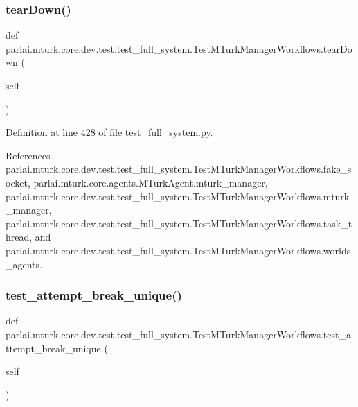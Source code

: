 \subsubsection{\texorpdfstring{tear\+Down()}{tearDown()}}
{\footnotesize\ttfamily def parlai.\+mturk.\+core.\+dev.\+test.\+test\+\_\+full\+\_\+system.\+Test\+M\+Turk\+Manager\+Workflows.\+tear\+Down (\begin{DoxyParamCaption}\item[{}]{self }\end{DoxyParamCaption})}



Definition at line 428 of file test\+\_\+full\+\_\+system.\+py.



References parlai.\+mturk.\+core.\+dev.\+test.\+test\+\_\+full\+\_\+system.\+Test\+M\+Turk\+Manager\+Workflows.\+fake\+\_\+socket, parlai.\+mturk.\+core.\+agents.\+M\+Turk\+Agent.\+mturk\+\_\+manager, parlai.\+mturk.\+core.\+dev.\+test.\+test\+\_\+full\+\_\+system.\+Test\+M\+Turk\+Manager\+Workflows.\+mturk\+\_\+manager, parlai.\+mturk.\+core.\+dev.\+test.\+test\+\_\+full\+\_\+system.\+Test\+M\+Turk\+Manager\+Workflows.\+task\+\_\+thread, and parlai.\+mturk.\+core.\+dev.\+test.\+test\+\_\+full\+\_\+system.\+Test\+M\+Turk\+Manager\+Workflows.\+worlds\+\_\+agents.

\mbox{\label{classparlai_1_1mturk_1_1core_1_1dev_1_1test_1_1test__full__system_1_1TestMTurkManagerWorkflows_af8fb1855f1850953ad500543b1a4ff5c}} 
\subsubsection{\texorpdfstring{test\+\_\+attempt\+\_\+break\+\_\+unique()}{test\_attempt\_break\_unique()}}
{\footnotesize\ttfamily def parlai.\+mturk.\+core.\+dev.\+test.\+test\+\_\+full\+\_\+system.\+Test\+M\+Turk\+Manager\+Workflows.\+test\+\_\+attempt\+\_\+break\+\_\+unique (\begin{DoxyParamCaption}\item[{}]{self }\end{DoxyParamCaption})}



